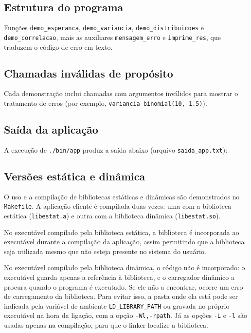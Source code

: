 \documentclass[12pt,a4paper]{article}
\newcommand{\cod}[1]{\texttt{#1}}
\newcommand{\saida}[1]{}
\begin{document}
\subsection{Estrutura do programa}
Funções \cod{demo\_esperanca}, \cod{demo\_variancia}, \cod{demo\_distribuicoes}
e \cod{demo\_correlacao}, mais as auxiliares \cod{mensagem\_erro} e
\cod{imprime\_res}, que traduzem o código de erro em texto.

\subsection{Chamadas inválidas de propósito}
Cada demonstração inclui chamadas com argumentos inválidos para mostrar o
tratamento de erros (por exemplo, \cod{variancia\_binomial(10, 1.5)}).

\subsection{Saída da aplicação}
A execução de \cod{./bin/app} produz a saída abaixo (arquivo \cod{saida\_app.txt}):
\saida{saida_app.txt}

\subsection{Versões estática e dinâmica}
O uso e a compilação de bibliotecas estáticas e dinâmicas são demonstrados no \cod{Makefile}. A aplicação cliente é compilada duas vezes: uma com a biblioteca estática (\cod{libestat.a}) e outra com a biblioteca dinâmica (\cod{libestat.so}).

No executável compilado pela biblioteca estática, a biblioteca é incorporada ao executável durante a compilação da aplicação, assim permitindo que a biblioteca seja utilizada mesmo que não esteja presente no sistema do usuário.

No executável compilado pela biblioteca dinâmica, o código não é incorporado: o executável guarda apenas a referência à biblioteca, e o carregador dinâmico a procura quando o programa é executado. 
Se ele não a encontrar, ocorre um erro de carregamento da biblioteca. Para evitar isso, a pasta onde ela está pode ser indicada pela variável de ambiente \cod{LD\_LIBRARY\_PATH} ou gravada no próprio executável
na hora da ligação, com a opção \cod{-Wl,-rpath}. 
Já as opções \cod{-L} e \cod{-l} são usadas apenas na compilação, para que o linker localize a biblioteca.
\end{document}
